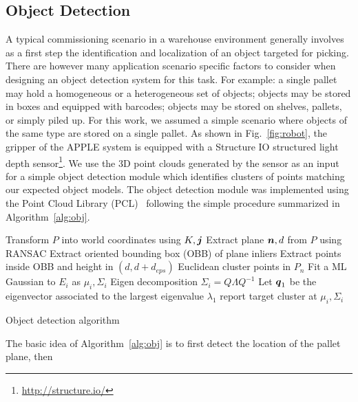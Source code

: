 \subsection{Object Detection}
\label{subsec:obj_det}
%
A typical commissioning scenario in a warehouse environment generally involves as a first step the
identification and localization of an object targeted for picking. There are however many
application scenario specific factors to consider when designing an object detection system for this
task. For example: a single pallet may hold a homogeneous or a heterogeneous set of objects; objects
may be stored in boxes and equipped with barcodes; objects may be stored on shelves, pallets, or
simply piled up. For this work, we assumed a simple scenario where objects of the same type are
stored on a single pallet. As shown in Fig.~\ref{fig:robot}, the gripper of the APPLE system is
equipped with a Structure IO structured light depth sensor\footnote{\url{http://structure.io/}}. We
use the 3D point clouds generated by the sensor as an input for a simple object detection module
which identifies clusters of points matching our expected object models. The object detection module
was implemented using the Point Cloud Library (PCL)~\cite{Rusu11} following the simple procedure
summarized in Algorithm~\ref{alg:obj}.
\begin{algorithm}[t!]
{}
Transform $P$ into world coordinates using $K,\mbox{\boldmath $j$}$\;
 {
    Extract plane $\mbox{\boldmath $n$},d$ from $P$ using RANSAC\;
}
Extract oriented bounding box (OBB) of plane inliers\;
Extract points inside OBB and height in $(d,d+d_{eps})$\;
Euclidean cluster points in $P_n$\;
 {
    Fit a ML Gaussian to $E_i$ as $\mu_i,\Sigma_i$\;
    Eigen decomposition $\Sigma_i=Q\Lambda Q^{-1}$\;
    Let $\mbox{\boldmath $q$}_1$ be the eigenvector associated to the largest eigenvalue $\lambda_1$\;
     {report target cluster at $\mu_i,\Sigma_i$\;}
}
\caption{Object detection algorithm}\label{alg:obj}
\end{algorithm}
%
\par
The basic idea of Algorithm~\ref{alg:obj} is to first detect the location of the pallet plane, then
